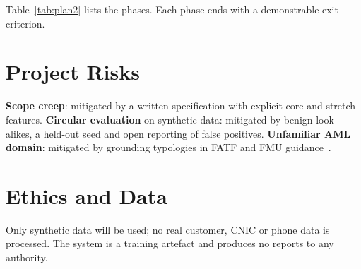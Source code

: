 \documentclass[conference,10pt]{IEEEtran}
\begin{document}
Table~\ref{tab:plan2} lists the phases. Each phase ends with a demonstrable exit criterion.

\section{Project Risks}
\textbf{Scope creep}: mitigated by a written specification with explicit core and stretch features.
\textbf{Circular evaluation} on synthetic data: mitigated by benign look-alikes, a held-out seed and
open reporting of false positives.
\textbf{Unfamiliar AML domain}: mitigated by grounding typologies in FATF and FMU
guidance~\cite{fatf2012rec,fatf2018pml}.

\section{Ethics and Data}
Only synthetic data will be used; no real customer, CNIC or phone data is processed. The system is a
training artefact and produces no reports to any authority.

\balance


\end{document}
